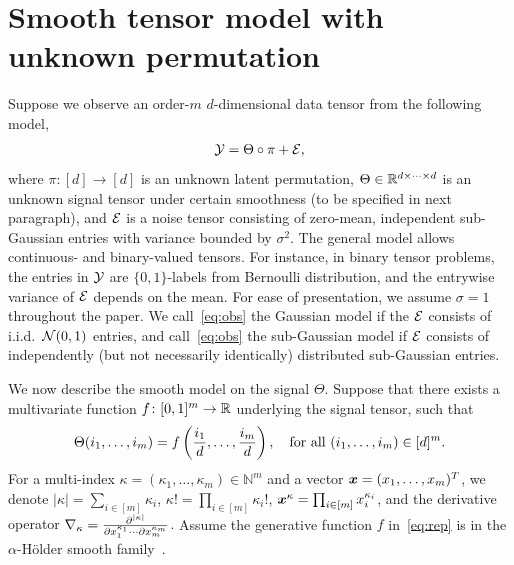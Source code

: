 \documentclass[12pt]{article}
\theoremstyle{definition}
\begin{document}
\section{Smooth tensor model with unknown permutation}\label{sec:model}
Suppose we observe an order-$m$ $d$-dimensional data tensor from the following model,
\begin{equation}\label{eq:obs}
\mathcal{Y}=\Theta\circ \pi+\mathcal{E},
\end{equation}
where $\pi\colon[d]\rightarrow[d]$ is an unknown latent permutation,  $\Theta\in \mathbb{R}^{d\times \cdots \times d}$ is an unknown signal tensor under certain smoothness (to be specified in next paragraph), and $\mathcal{E}$ is a noise tensor consisting of zero-mean, independent sub-Gaussian entries with variance bounded by $\sigma^2$. The general model allows continuous- and binary-valued tensors. For instance, in binary tensor problems, the entries in $\mathcal{Y}$ are $\{0, 1\}$-labels from Bernoulli distribution, and the entrywise variance of $\mathcal{E}$ depends on the mean. For ease of presentation, we assume $\sigma=1$ throughout the paper. We call~\eqref{eq:obs} the Gaussian model if the $\mathcal{E}$ consists of i.i.d.\ $\mathcal{N}(0,1)$ entries, and call~\eqref{eq:obs} the sub-Gaussian model if $\mathcal{E}$ consists of independently (but not necessarily identically) distributed sub-Gaussian entries. 
 

We now describe the smooth model on the signal $\Theta$. Suppose that there exists a multivariate function $f\colon [0,1]^m\rightarrow \mathbb{R}$ underlying the signal tensor, such that
\begin{align}\label{eq:rep}
\Theta(i_1,\ldots,i_m) = f\left({i_1\over d},\ldots,{i_m\over d}\right), \quad \text{for all }(i_1,\ldots,i_m)\in[d]^m.
\end{align}
{\color{blue}For a multi-index $\kappa=(\kappa_1,\ldots,\kappa_m)\in\mathbb{N}^m$ and a vector $\bm x=(x_1,\ldots,x_m)^T$, we denote $|\kappa|=\sum_{i\in[m]}\kappa_i$, $\kappa!=\prod_{i\in[m]}\kappa_i!$, $\bm x^\kappa=\prod_{i\in[m]}x_i^{\kappa_i}$, and the derivative operator $\nabla_{\kappa}={\partial^{|\kappa|} \over \partial x^{\kappa_1}_1\cdots \partial x_m^{\kappa_m}}$.} Assume the generative function $f$ in~\eqref{eq:rep} is in the $\alpha$-H\"older smooth family~\cite{wasserman2006all,tsybakov2009introduction}. 
\end{document}
